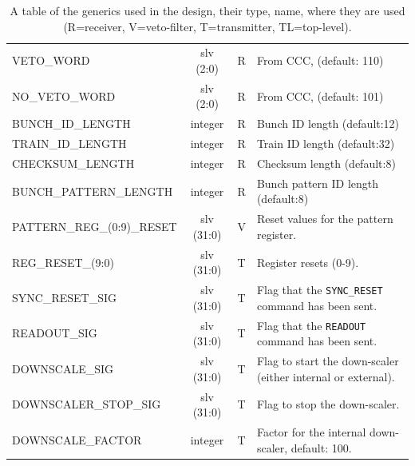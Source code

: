 \begin{table}
\begin{center}
\begin{tabulary}{\textwidth}{l| c | c | L}
      VETO\_WORD                 & slv (2:0)  &  R              & From CCC, (default: 110)            \\
      NO\_VETO\_WORD             & slv (2:0)  &  R              & From CCC, (default: 101)            \\
      BUNCH\_ID\_LENGTH          & integer    &  R              & Bunch ID length (default:12)        \\
      TRAIN\_ID\_LENGTH          & integer    &  R              & Train ID length (default:32)        \\
      CHECKSUM\_LENGTH           & integer    &  R              & Checksum length (default:8)         \\
      BUNCH\_PATTERN\_LENGTH     & integer    &  R              & Bunch pattern ID length (default:8) \\
      \hline                                                    
      PATTERN\_REG\_(0:9)\_RESET & slv (31:0) &  V              & Reset values for the pattern register.\\
      \hline                                                    
      REG\_RESET\_(9:0)          & slv (31:0) &  T              & Register resets (0-9). \\
      SYNC\_RESET\_SIG           & slv (31:0) &  T              & Flag that the \texttt{SYNC\_RESET} command has been sent.   \\
      READOUT\_SIG               & slv (31:0) &  T              & Flag that the \texttt{READOUT} command has been sent.       \\
      DOWNSCALE\_SIG             & slv (31:0) &  T              & Flag to start the down-scaler (either internal or external).\\
      DOWNSCALER\_STOP\_SIG      & slv (31:0) &  T              & Flag to stop the down-scaler.                               \\
      DOWNSCALE\_FACTOR          & integer    &  T              & Factor for the internal down-scaler, default: 100.          \\
    \end{tabulary}
  \end{center}
  \caption{A table of the generics used in the design, their type, name, where they are used (R=receiver, V=veto-filter, T=transmitter, TL=top-level).}
  \label{tab:all_generics}
\end{table}

